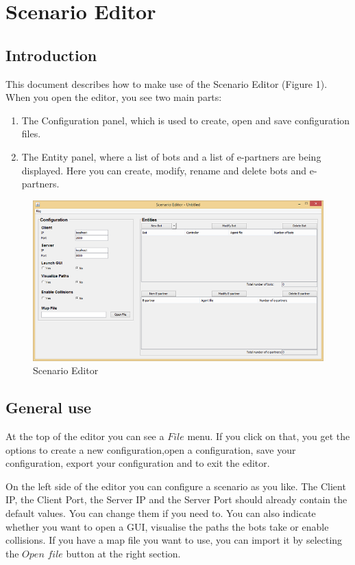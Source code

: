 \newpage
\section{Scenario Editor}


\subsection{Introduction}
This document describes how to make use of the Scenario Editor (Figure 1). When you open the editor, you see two main parts:
\begin{enumerate}
\item The Configuration panel, which is used to create, open and save configuration files.
\item The Entity panel, where a list of bots and a list of e-partners are being displayed. Here you can create, modify, rename and delete bots and e-partners.
\end{enumerate}

\begin{figure}[h]
\begin{center}
\includegraphics{ScenarioEditor/editor.png}
\caption{Scenario Editor}
\end{center}
\end{figure}

\subsection{General use}
At the top of the editor you can see a $File$ menu. If you click on that, you get the options to create a new configuration,open a configuration, save your configuration, export your configuration and to exit the editor.

On the left side of the editor you can configure a scenario as you like. The Client IP, the Client Port, the Server IP and the Server Port should already contain the default values. You can change them if you need to. You can also indicate whether you want to open a GUI, visualise the paths the bots take or enable collisions. If you have a map file you want to use, you can import it by selecting the $Open$ $file$ button at the right section.

